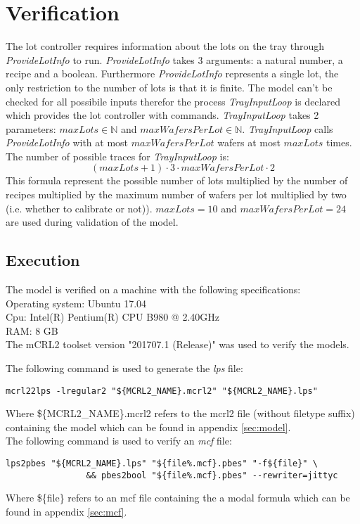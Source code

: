 \section{Verification}\label{sec:results}
The lot controller requires information about the lots on the tray through \textit{ProvideLotInfo} to run. \textit{ProvideLotInfo} takes 3 arguments: a natural number, a recipe and a boolean. Furthermore \textit{ProvideLotInfo} represents a single lot, the only restriction to the number of lots is that it is finite. The model can't be checked for all possibile inputs therefor the process \textit{TrayInputLoop} is declared which provides the lot controller with  commands. \textit{TrayInputLoop} takes 2 parameters: $\mathit{maxLots} \in \mathbb{N}$ and $\mathit{maxWafersPerLot} \in \mathbb{N}$. \textit{TrayInputLoop} calls \textit{ProvideLotInfo} with at most $\mathit{maxWafersPerLot}$ wafers at most $\mathit{maxLots}$ times. The number of possible traces for \textit{TrayInputLoop} is:
$$(\mathit{maxLots}+1) \cdot 3 \cdot \mathit{maxWafersPerLot} \cdot 2$$
This formula represent the possible number of lots multiplied by the number of recipes multiplied by the maximum number of wafers per lot multiplied by two (i.e. whether to calibrate or not)). $\mathit{maxLots} = 10$ and $\mathit{maxWafersPerLot} = 24$ are used during validation of the model.

\subsection{Execution}
The model is verified on a machine with the following specifications:\\
Operating system: Ubuntu 17.04\\
Cpu: Intel(R) Pentium(R) CPU B980 @ 2.40GHz\\
RAM: 8 GB\\

The mCRL2 toolset version "201707.1 (Release)" was used to verify the models.

The following command is used to generate the \textit{lps} file:\\
\begin{lstlisting}[style=sh,caption={mcf2lps}] 
mcrl22lps -lregular2 "${MCRL2_NAME}.mcrl2" "${MCRL2_NAME}.lps"
\end{lstlisting}
Where \$\{MCRL2\_NAME\}.mcrl2 refers to the mcrl2 file (without filetype suffix) containing the model which can be found in appendix \ref{sec:model}.\\
The following command is used to verify an \textit{mcf} file:\\
\begin{lstlisting}[style=sh,caption={mcf check}] 
lps2pbes "${MCRL2_NAME}.lps" "${file%.mcf}.pbes" "-f${file}" \
                && pbes2bool "${file%.mcf}.pbes" --rewriter=jittyc
\end{lstlisting}
Where \$\{file\} refers to an mcf file containing the a modal formula which can be found in appendix \ref{sec:mcf}.\\
